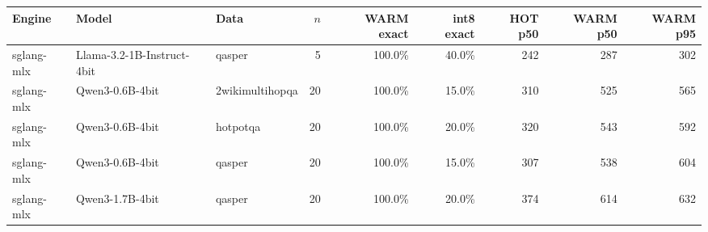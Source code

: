 \begin{tabular}{lllrrrrrr}
\toprule
Engine & Model & Data & $n$ & WARM exact & int8 exact & HOT p50 & WARM p50 & WARM p95 \\
\midrule
sglang-mlx & Llama-3.2-1B-Instruct-4bit & qasper & 5 & 100.0\% & 40.0\% & 242 & 287 & 302 \\
sglang-mlx & Qwen3-0.6B-4bit & 2wikimultihopqa & 20 & 100.0\% & 15.0\% & 310 & 525 & 565 \\
sglang-mlx & Qwen3-0.6B-4bit & hotpotqa & 20 & 100.0\% & 20.0\% & 320 & 543 & 592 \\
sglang-mlx & Qwen3-0.6B-4bit & qasper & 20 & 100.0\% & 15.0\% & 307 & 538 & 604 \\
sglang-mlx & Qwen3-1.7B-4bit & qasper & 20 & 100.0\% & 20.0\% & 374 & 614 & 632 \\
\bottomrule
\end{tabular}
